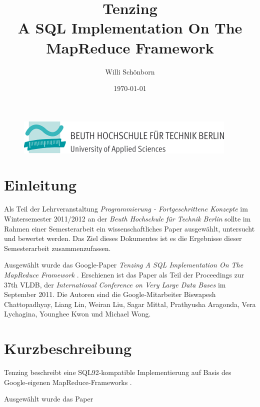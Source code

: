\documentclass[a4paper]{article}
\title{Tenzing \\ A SQL Implementation On The MapReduce Framework}
\author{Willi Schönborn}
\date{\today}
\begin{document}
\begin{figure}[H]
\centering
\includegraphics{beuth.png}
\maketitle
\end{figure}

\section*{Einleitung}
Als Teil der Lehrveranstaltung \textit{Programmierung - Fortgeschrittene Konzepte} im Wintersemester 2011/2012 an der \textit{Beuth Hochschule für Technik Berlin} sollte im Rahmen einer Semesterarbeit ein wissenschaftliches Paper ausgewählt, untersucht und bewertet werden. Das Ziel dieses Dokumentes ist es die Ergebnisse dieser Semesterarbeit zusammenzufassen.

Ausgewählt wurde das Google-Paper \textit{Tenzing A SQL Implementation On The MapReduce Framework} \cite{TENZING}. Erschienen ist das Paper als Teil der Proceedings zur 37th VLDB, der \textit{International Conference on Very Large Data Bases} im September 2011. Die Autoren sind die Google-Mitarbeiter Biswapesh Chattopadhyay, Liang Lin, Weiran Liu, Sagar Mittal, Prathyusha Aragonda, Vera Lychagina, Younghee Kwon und Michael Wong.

\section*{Kurzbeschreibung}
Tenzing beschreibt eine SQL92-kompatible Implementierung auf Basis des Google-eigenen MapReduce-Frameworks \cite{MAPREDUCE}.

Ausgewählt wurde das Paper 

\newpage

\nocite{GFS}
\nocite{GOOGLE-TENZING}
\nocite{GOOGLE-MAPREDUCE}
\nocite{GOOGLE-GFS}
\nocite{WP-SQL92}
\nocite{WP-SQL99}
\printbibliography
\end{document}
